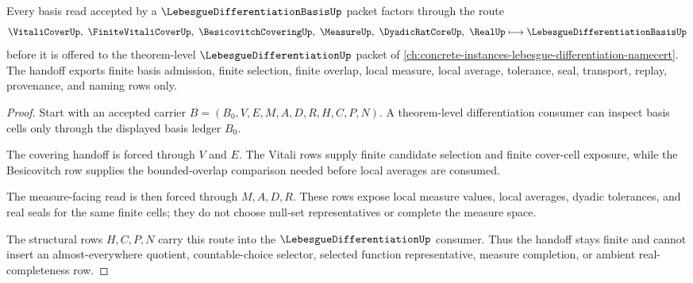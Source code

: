 \begin{theorem}
\label{thm:lebesgue-differentiation-basis-finite-cover-handoff}
Every basis read accepted by a $\LebesgueDifferentiationBasisUp$ packet factors through the route
$$
\VitaliCoverUp,\ \FiniteVitaliCoverUp,\ \BesicovitchCoveringUp,\ \MeasureUp,\ \DyadicRatCoreUp,\ \RealUp
\longmapsto
\LebesgueDifferentiationBasisUp
$$
before it is offered to the theorem-level $\LebesgueDifferentiationUp$ packet of \autoref{ch:concrete-instances-lebesgue-differentiation-namecert}. The handoff exports finite basis admission, finite selection, finite overlap, local measure, local average, tolerance, seal, transport, replay, provenance, and naming rows only.
\end{theorem}
\begin{proof}
Start with an accepted carrier $B=(B_0,V,E,M,A,D,R,H,C,P,N)$. A theorem-level differentiation consumer can inspect basis cells only through the displayed basis ledger $B_0$.

The covering handoff is forced through $V$ and $E$. The Vitali rows supply finite candidate selection and finite cover-cell exposure, while the Besicovitch row supplies the bounded-overlap comparison needed before local averages are consumed.

The measure-facing read is then forced through $M,A,D,R$. These rows expose local measure values, local averages, dyadic tolerances, and real seals for the same finite cells; they do not choose null-set representatives or complete the measure space.

The structural rows $H,C,P,N$ carry this route into the $\LebesgueDifferentiationUp$ consumer. Thus the handoff stays finite and cannot insert an almost-everywhere quotient, countable-choice selector, selected function representative, measure completion, or ambient real-completeness row.
\end{proof}


